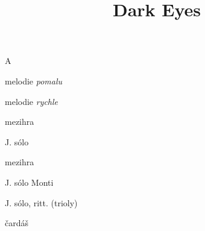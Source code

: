 \documentclass[timestamp]{jazzgrid}
\title{\textbf{Dark Eyes}}
\begin{document}
\maketitle
\begin{musicsection}{A}
\barline
	{\barfour{}
		{}
		{}
		{}
		{}
	}
	{\barfour{}
		{}
		{}
		{}
		{}
	}
	{\barfour{}
		{}
		{}
		{}
		{}
	}
	{\barfour{}
		{}
		{}
		{}
		{}
	}
\barline
	{\barfour{}
		{}
		{}
		{}
		{}
	}
	{\barfour{}
		{}
		{}
		{}
		{}
	}
	{\barfour{}
		{}
		{}
		{}
		{}
	}
	{\barfour{}
		{}
		{}
		{}
		{}
	}
\barline
	{\barfour{}
		{}
		{}
		{}
		{}
	}
	{\barfour{}
		{}
		{}
		{}
		{}
	}
	{\barfour{}
		{}
		{}
		{}
		{}
	}
	{\barfour{}
		{}
		{}
		{}
		{}
	}
\barline
	{\barfour{}
		{}
		{}
		{}
		{}
	}
	{\barfour{}
		{}
		{}
		{}
		{}
	}
	{\barfour{}
		{}
		{}
		{}
		{}
	}
	{\barfour{}
		{}
		{}
		{}
		{}
	}
\end{musicsection}

\begin{multicols*}{2}
\begin{description}[noitemsep,align=right,labelwidth=\widthof{\scriptsize\bfseries{2$\times$A}}]
	\scriptsize
	\item [A] melodie \emph{pomalu}
	\item [A] melodie \emph{rychle}
	\item [A] mezihra
	\item [2$\times$A] J. sólo
	\item [A] mezihra
	\item [A] J. sólo Monti
	\item [2$\times$A] J. sólo, ritt. (trioly)
	\item [A] čardáš
\end{description}
\end{multicols*}
\end{document}
